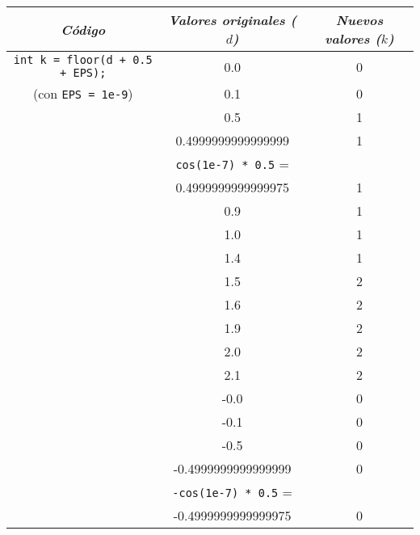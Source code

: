 \documentclass[10pt,letterpaper,twocolumn]{article}
\begin{document}
\begin{center}
  \renewcommand{\arraystretch}{1.3} %
  \begin{tabular}{| c | c | c | }
    \hline
    \textit{Código} & \textit{Valores originales ($d$)} & \textit{Nuevos valores ($k$)} \\
    \hline\hline

    \verb_int k = floor(d + 0.5 + EPS);_ & 0.0  & 0 \\ \cline{2-3}
    (con \verb_EPS = 1e-9_)              & 0.1  & 0 \\ \cline{2-3}
                                         & 0.5  & 1 \\ \cline{2-3}
                                         & 0.4999999999999999 & 1 \\ \cline{2-3}
                                         & \verb_cos(1e-7) * 0.5_ =  & \\ & 0.4999999999999975 & 1 \\ \cline{2-3}
                                         & 0.9  & 1 \\ \cline{2-3}
                                         & 1.0 & 1 \\ \cline{2-3}
                                         & 1.4 & 1 \\ \cline{2-3}
                                         & 1.5 & 2 \\ \cline{2-3}
                                         & 1.6 & 2 \\ \cline{2-3}
                                         & 1.9 & 2 \\ \cline{2-3}
                                         & 2.0 & 2 \\ \cline{2-3}
                                         & 2.1 & 2 \\ \cline{2-3}
                                         & -0.0  & 0 \\ \cline{2-3}
                                         & -0.1  & 0 \\ \cline{2-3}
                                         & -0.5  & 0 \\ \cline{2-3}
                                         & -0.4999999999999999 & 0 \\ \cline{2-3}
                                         & \verb_-cos(1e-7) * 0.5_ =  & \\ & -0.4999999999999975 & 0 \\ \cline{2-3}

\end{tabular}
\end{center}
\end{document}
